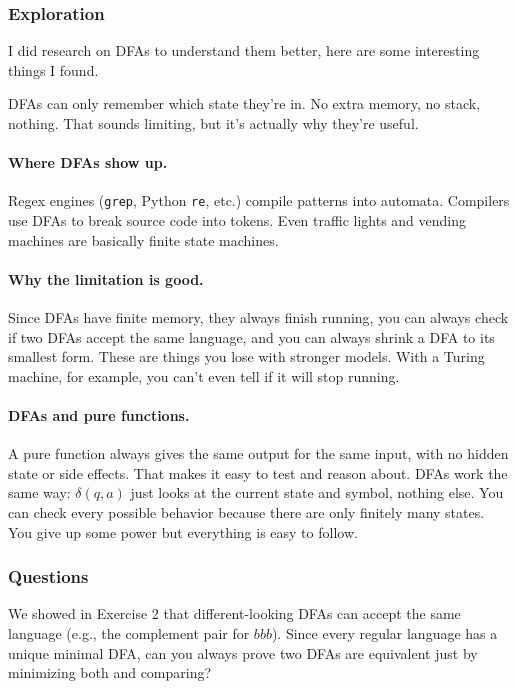 \documentclass{article}
\theoremstyle{theorem}
\theoremstyle{definition}
\theoremstyle{remark}
\begin{document}
\subsubsection{Exploration}

I did research on DFAs to understand them better, here are some interesting things I found.

DFAs can only remember which state they're in. No extra memory, no stack, nothing. That sounds limiting, but it's actually why they're useful.

\paragraph{Where DFAs show up.} Regex engines (\texttt{grep}, Python \texttt{re}, etc.) compile patterns into automata. Compilers use DFAs to break source code into tokens. Even traffic lights and vending machines are basically finite state machines.

\paragraph{Why the limitation is good.} Since DFAs have finite memory, they always finish running, you can always check if two DFAs accept the same language, and you can always shrink a DFA to its smallest form. These are things you lose with stronger models. With a Turing machine, for example, you can't even tell if it will stop running.

\paragraph{DFAs and pure functions.} A pure function always gives the same output for the same input, with no hidden state or side effects. That makes it easy to test and reason about. DFAs work the same way: $\delta(q, a)$ just looks at the current state and symbol, nothing else. You can check every possible behavior because there are only finitely many states. You give up some power but everything is easy to follow.

\subsubsection{Questions}

We showed in Exercise 2 that different-looking DFAs can accept the same language (e.g., the complement pair for $bbb$). Since every regular language has a unique minimal DFA, can you always prove two DFAs are equivalent just by minimizing both and comparing?
\end{document}
